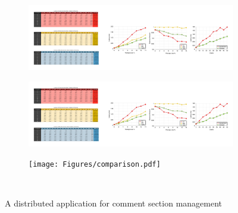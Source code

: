 \begin{figure}[t]
        \centering
	\begin{subfigure}[t]{0.25\textwidth}
	\centering
	\hspace{-13mm}
	\includegraphics[scale=0.22]{Figures/latency.pdf}
	\end{subfigure}
	\begin{subfigure}[t]{0.36\textwidth}
	\centering
	\includegraphics[scale=0.22]{Figures/staleness.pdf}
	\label{subfig:comment_example}
	\end{subfigure} 
	\begin{subfigure}[t]{0.28\textwidth}
	\centering
	\texttt{[image: Figures/comparison.pdf]}
	\label{subfig:comment_example}
	\end{subfigure} 
\\ \hrulefill
\caption{A distributed application for comment section
management}
\label{fig:eval}
\end{figure}

